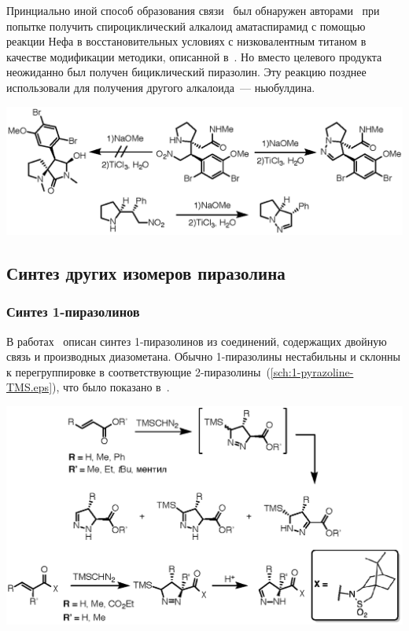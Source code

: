 Принциально иной способ образования связи~ был обнаружен авторами~\cite{Pangerl2010} при попытке получить спироциклический алкалоид аматаспирамид с помощью реакции Нефа в восстановительных условиях с низковалентным титаном в качестве модификации методики, описанной в~\cite{Hughes2002a}.
Но вместо целевого продукта неожиданно был получен бициклический пиразолин. 
Эту реакцию позднее использовали для получения другого алкалоида~--- ньюбулдина.

\begin{scheme}[h!]
    \centering
    \includegraphics{sections/literature/img/reductiveNN.eps}
    \caption{}
    \label{sch:reductiveNN}
\end{scheme}

\FloatBarrier{}

\subsection{Синтез других изомеров пиразолина}

\subsubsection{Синтез 1-пиразолинов}
В работах~\cite{Baldwin1990, Mish1997, Simovic2007, Sun2013} описан синтез 1-пиразолинов из соединений, содержащих двойную связь и производных диазометана.
Обычно 1-пиразолины нестабильны и склонны к перегруппировке в соответствующие 2-пиразолины~(\ref{sch:1-pyrazoline-TMS.eps}), что было показано в~\cite{Mish1997, Simovic2007}.

\begin{scheme}[h!]
    \centering
    \includegraphics{sections/literature/img/1-pyrazoline-TMS.eps}
    \caption{}
    \label{sch:1-pyrazoline-TMS.eps}
\end{scheme}

